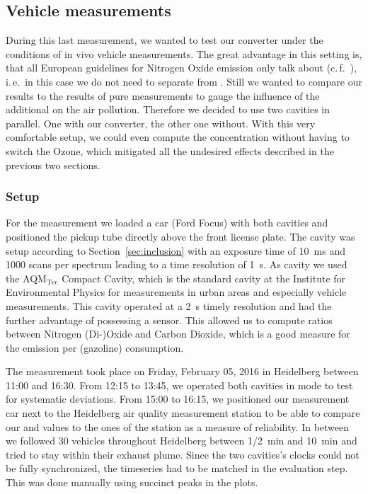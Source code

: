 \subsection{Vehicle measurements}
\label{sec:vehicle}

During this last measurement, we wanted to test our converter under
the conditions of in vivo vehicle measurements. The great advantage in
this setting is, that all European guidelines for Nitrogen Oxide
emission only talk about  (c.\,f.~\cite{eu}), i.\,e.\ in this
case we do not need to separate  from . Still we wanted
to compare our  results to the results of pure 
measurements to gauge the influence of the additional  on the
air pollution. Therefore we decided to use two cavities in
parallel. One with our converter, the other one without. With this
very comfortable setup, we could even compute the 
concentration without having to switch the Ozone, which mitigated all
the undesired effects described in the previous two sections.

\subsubsection{Setup}
\label{sec:vehicle-setup}

For the measurement we loaded a car (Ford Focus) with both cavities
and positioned the pickup tube directly above the front license
plate. The  cavity was setup according to
Section~\ref{sec:inclusion} with an exposure time of
\SI{10}{\milli\second} and 1000 scans per spectrum leading to a time
resolution of \SI{1}{\second}. As 
cavity we used the AQM$_{\text{Tec}}$ Compact Cavity, which is the
standard cavity at the Institute for Environmental Physics for
measurements in urban areas and especially vehicle measurements. This
cavity operated at a \SI{2}{\second} timely resolution and had the
further advantage of possessing a  sensor. This allowed us to
compute ratios between Nitrogen (Di-)Oxide and Carbon Dioxide, which
is a good measure for the emission per (gazoline) consumption. 

The measurement took place on Friday, February 05, 2016 in Heidelberg
between 11:00 and 16:30. From 12:15 to 13:45, we operated both
cavities in  mode to test for systematic deviations. From
15:00 to 16:15, we positioned our measurement car next to the
Heidelberg air quality measurement station to be able to compare our
 and  values to the ones of the station as a measure of
reliability. In between we followed 30 vehicles throughout
Heidelberg between {\nfrac{} 1/2}~\si{\minute} and \SI{10}{\minute}
and tried to stay within their exhaust plume. Since the two cavities's
clocks could not be fully synchronized, the timeseries had to be
matched in the evaluation step. This was done manually using succinct
peaks in the plots.

